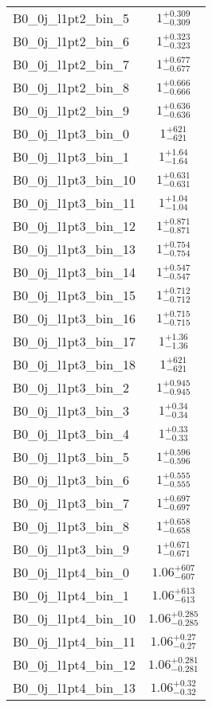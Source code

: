\begin{tabular}{|l|c|}
B0\_0j\_l1pt2\_bin\_5 & $1^{+0.309}_{-0.309}$ \\
B0\_0j\_l1pt2\_bin\_6 & $1^{+0.323}_{-0.323}$ \\
B0\_0j\_l1pt2\_bin\_7 & $1^{+0.677}_{-0.677}$ \\
B0\_0j\_l1pt2\_bin\_8 & $1^{+0.666}_{-0.666}$ \\
B0\_0j\_l1pt2\_bin\_9 & $1^{+0.636}_{-0.636}$ \\
B0\_0j\_l1pt3\_bin\_0 & $1^{+621}_{-621}$ \\
B0\_0j\_l1pt3\_bin\_1 & $1^{+1.64}_{-1.64}$ \\
B0\_0j\_l1pt3\_bin\_10 & $1^{+0.631}_{-0.631}$ \\
B0\_0j\_l1pt3\_bin\_11 & $1^{+1.04}_{-1.04}$ \\
B0\_0j\_l1pt3\_bin\_12 & $1^{+0.871}_{-0.871}$ \\
B0\_0j\_l1pt3\_bin\_13 & $1^{+0.754}_{-0.754}$ \\
B0\_0j\_l1pt3\_bin\_14 & $1^{+0.547}_{-0.547}$ \\
B0\_0j\_l1pt3\_bin\_15 & $1^{+0.712}_{-0.712}$ \\
B0\_0j\_l1pt3\_bin\_16 & $1^{+0.715}_{-0.715}$ \\
B0\_0j\_l1pt3\_bin\_17 & $1^{+1.36}_{-1.36}$ \\
B0\_0j\_l1pt3\_bin\_18 & $1^{+621}_{-621}$ \\
B0\_0j\_l1pt3\_bin\_2 & $1^{+0.945}_{-0.945}$ \\
B0\_0j\_l1pt3\_bin\_3 & $1^{+0.34}_{-0.34}$ \\
B0\_0j\_l1pt3\_bin\_4 & $1^{+0.33}_{-0.33}$ \\
B0\_0j\_l1pt3\_bin\_5 & $1^{+0.596}_{-0.596}$ \\
B0\_0j\_l1pt3\_bin\_6 & $1^{+0.555}_{-0.555}$ \\
B0\_0j\_l1pt3\_bin\_7 & $1^{+0.697}_{-0.697}$ \\
B0\_0j\_l1pt3\_bin\_8 & $1^{+0.658}_{-0.658}$ \\
B0\_0j\_l1pt3\_bin\_9 & $1^{+0.671}_{-0.671}$ \\
B0\_0j\_l1pt4\_bin\_0 & $1.06^{+607}_{-607}$ \\
B0\_0j\_l1pt4\_bin\_1 & $1.06^{+613}_{-613}$ \\
B0\_0j\_l1pt4\_bin\_10 & $1.06^{+0.285}_{-0.285}$ \\
B0\_0j\_l1pt4\_bin\_11 & $1.06^{+0.27}_{-0.27}$ \\
B0\_0j\_l1pt4\_bin\_12 & $1.06^{+0.281}_{-0.281}$ \\
B0\_0j\_l1pt4\_bin\_13 & $1.06^{+0.32}_{-0.32}$ \\

\end{tabular}
